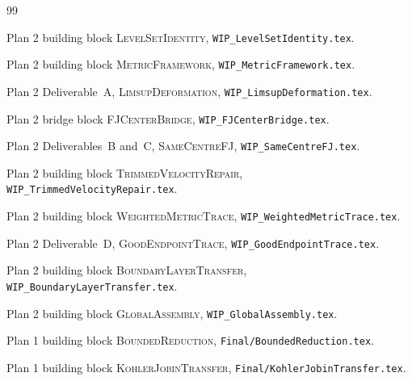 \documentclass[11pt]{article}
\theoremstyle{definition}
\begin{document}
\begin{thebibliography}{99}

Plan 2 building block \textsc{LevelSetIdentity},
\texttt{WIP\_LevelSetIdentity.tex}.

Plan 2 building block \textsc{MetricFramework},
\texttt{WIP\_MetricFramework.tex}.

Plan 2 Deliverable~A, \textsc{LimsupDeformation},
\texttt{WIP\_LimsupDeformation.tex}.

Plan 2 bridge block \textsc{FJCenterBridge},
\texttt{WIP\_FJCenterBridge.tex}.

Plan 2 Deliverables~B and~C, \textsc{SameCentreFJ},
\texttt{WIP\_SameCentreFJ.tex}.

Plan 2 building block \textsc{TrimmedVelocityRepair},
\texttt{WIP\_TrimmedVelocityRepair.tex}.

Plan 2 building block \textsc{WeightedMetricTrace},
\texttt{WIP\_WeightedMetricTrace.tex}.

Plan 2 Deliverable~D, \textsc{GoodEndpointTrace},
\texttt{WIP\_GoodEndpointTrace.tex}.

Plan 2 building block \textsc{BoundaryLayerTransfer},
\texttt{WIP\_BoundaryLayerTransfer.tex}.

Plan 2 building block \textsc{GlobalAssembly},
\texttt{WIP\_GlobalAssembly.tex}.

Plan 1 building block \textsc{BoundedReduction},
\texttt{Final/BoundedReduction.tex}.

Plan 1 building block \textsc{KohlerJobinTransfer},
\texttt{Final/KohlerJobinTransfer.tex}.

\end{thebibliography}
\end{document}
